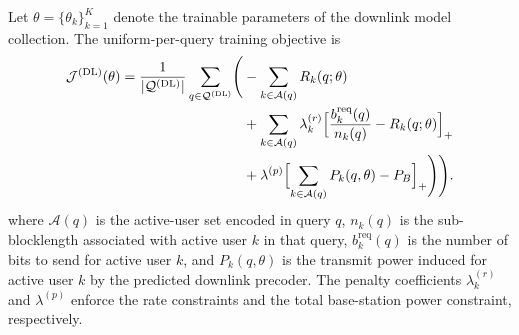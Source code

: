 \documentclass[11pt]{article}
\newcommand{\Aset}{\mathcal{A}}
\newcommand{\Qset}{\mathcal{Q}}
\newcommand{\DL}{\mathrm{DL}}
\begin{document}
Let $\theta=\{\theta_k\}_{k=1}^K$ denote the trainable parameters of the
downlink model collection. The uniform-per-query training objective is
\begin{equation}
\begin{aligned}
\mathcal{J}^{(\DL)}(\theta)
=
\frac{1}{\lvert\Qset^{(\DL)}\rvert}
\sum_{q\in\Qset^{(\DL)}}
\Biggl(
&-\sum_{k\in\Aset(q)} R_k(q;\theta)\\
&+ \sum_{k\in\Aset(q)}
\lambda_k^{(r)}
\Bigl[\frac{b_k^{\mathrm{req}}(q)}{n_k(q)}-R_k(q;\theta)\Bigr]_+\\
&+ \lambda^{(p)}
\Bigl[
\sum_{k\in\Aset(q)}P_k(q,\theta)-P_B
\Bigr]_+
\Biggr)
\Biggr).
\end{aligned}
\label{eq:dl-training-objective}
\end{equation}
where $\Aset(q)$ is the active-user set encoded in query $q$, $n_k(q)$ is the
sub-blocklength associated with active user $k$ in that query,
$b_k^{\mathrm{req}}(q)$ is the number of bits to send for active user $k$, and
$P_k(q,\theta)$ is the transmit power induced for active user $k$ by the
predicted downlink precoder. The penalty coefficients $\lambda_k^{(r)}$ and
$\lambda^{(p)}$ enforce the rate constraints and the total base-station power
constraint, respectively.
\end{document}

